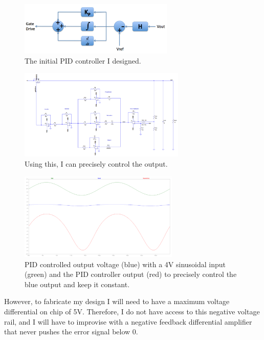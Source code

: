 \documentclass[10pt]{amsart}
\begin{document}
\begin{figure}[h]
	\begin{center}
		\includegraphics[height=1in]{Media/PID.png}
	\end{center}
	\caption{The initial PID controller I designed.}
	\label{fig:piedmont}
\end{figure}

\begin{figure}[h]
	\begin{center}
		\includegraphics[height=1.7in]{Media/PID_sc.png}
	\end{center}
	\caption{Using this, I can precisely control the output.}
	\label{fig:pid}
\end{figure}

\begin{figure}[h]
	\begin{center}
		\includegraphics[width=3in]{Media/pidfb.png}
	\end{center}
	\caption{PID controlled output voltage (blue) with a 4V sinusoidal input (green) and the PID controller output (red) to precisely control the blue output and keep it constant.}
	\label{fig:pidfb}
\end{figure}

\newpage

However, to fabricate my design I will need to have a maximum voltage differential on chip of 5V. Therefore, I do not have access to this negative voltage rail, and I will have to improvise with a negative feedback differential amplifier that never pushes the error signal below 0. \\
\end{document}
